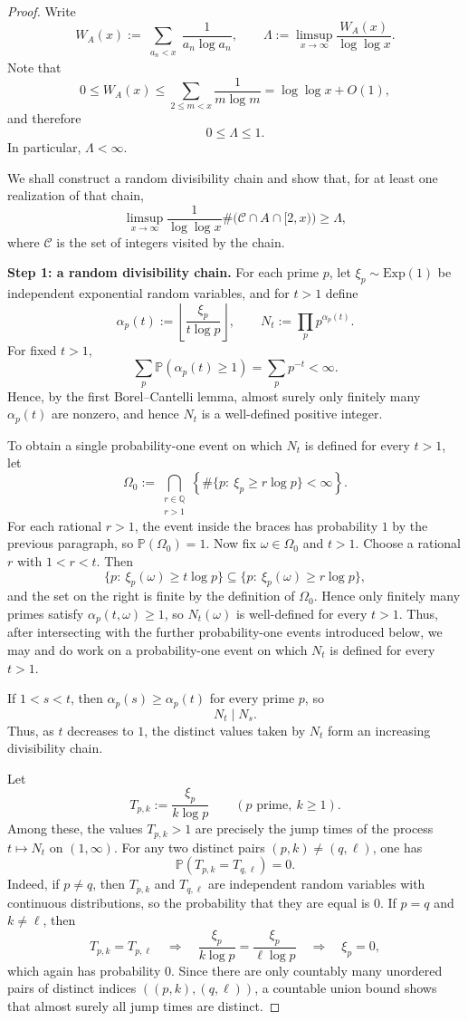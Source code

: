 \documentclass[11pt,letterpaper,reqno]{amsart}
\theoremstyle{definition}
\numberwithin{equation}{section}
\newcommand{\1}{\mathbf 1}
\begin{document}
\begin{proof}
Write
\[
W_A(x):=\sum_{\substack{a_n<x}}\frac{1}{a_n\log a_n},
\qquad
\Lambda:=\limsup_{x\to\infty}\frac{W_A(x)}{\log\log x}.
\]
Note that
\[
0\le W_A(x)\le \sum_{2\le m<x}\frac{1}{m\log m}=\log\log x+O(1),
\]
and therefore
\[
0\le \Lambda\le 1.
\]
In particular, \(\Lambda<\infty\).

We shall construct a random divisibility chain and show that, for at least one realization of that chain,
\[
\limsup_{x\to\infty}\frac{1}{\log\log x}\#\bigl(\mathcal C\cap A\cap [2,x)\bigr)\ge \Lambda,
\]
where $\mathcal C$ is the set of integers visited by the chain.

\medskip

\noindent
{\bf Step 1: a random divisibility chain.}
For each prime $p$, let $\xi_p\sim \mathrm{Exp}(1)$ be independent exponential random variables, and for $t>1$ define
\[
\alpha_p(t):=\left\lfloor \frac{\xi_p}{t\log p}\right\rfloor,
\qquad
N_t:=\prod_p p^{\alpha_p(t)}.
\]
For fixed $t>1$,
\[
\sum_p \mathbb P(\alpha_p(t)\ge 1)=\sum_p p^{-t}<\infty.
\]
Hence, by the first Borel--Cantelli lemma, almost surely only finitely many \(\alpha_p(t)\) are nonzero, and hence \(N_t\) is a well-defined positive integer.


To obtain a single probability-one event on which $N_t$ is defined for every $t>1$, let
\[
\Omega_0:=
\bigcap_{\substack{r\in\mathbb Q\\ r>1}}
\left\{
\#\{p:\ \xi_p\ge r\log p\}<\infty
\right\}.
\]
For each rational $r>1$, the event inside the braces has probability $1$ by the previous paragraph, so $\mathbb P(\Omega_0)=1$.
Now fix $\omega\in\Omega_0$ and $t>1$. Choose a rational $r$ with $1<r<t$. Then
\[
\{p:\ \xi_p(\omega)\ge t\log p\}
\subseteq
\{p:\ \xi_p(\omega)\ge r\log p\},
\]
and the set on the right is finite by the definition of $\Omega_0$. Hence only finitely many primes satisfy $\alpha_p(t,\omega)\ge 1$, so $N_t(\omega)$ is well-defined for every $t>1$.
Thus, after intersecting with the further probability-one events introduced below, we may and do work on a probability-one event on which $N_t$ is defined for every $t>1$.


If $1<s<t$, then $\alpha_p(s)\ge \alpha_p(t)$ for every prime $p$, so
\[
N_t\mid N_s.
\]
Thus, as $t$ decreases to $1$, the distinct values taken by $N_t$ form an increasing divisibility chain.

Let
\[
T_{p,k}:=\frac{\xi_p}{k\log p}\qquad (p\text{ prime},\ k\ge 1).
\]
Among these, the values \(T_{p,k}>1\) are precisely the jump times of the process \(t\mapsto N_t\) on \((1,\infty)\). For any two distinct pairs $(p,k)\neq(q,\ell)$, one has
\[
\mathbb P(T_{p,k}=T_{q,\ell})=0.
\]
Indeed, if $p\neq q$, then $T_{p,k}$ and $T_{q,\ell}$ are independent random variables with continuous distributions, so the probability that they are equal is $0$.
If $p=q$ and $k\neq \ell$, then
\[
T_{p,k}=T_{p,\ell}
\quad\Longrightarrow\quad
\frac{\xi_p}{k\log p}=\frac{\xi_p}{\ell\log p}
\quad\Longrightarrow\quad
\xi_p=0,
\]
which again has probability $0$.
Since there are only countably many unordered pairs of distinct indices $((p,k),(q,\ell))$, a countable union bound shows that almost surely all jump times are distinct.


\end{proof}
\end{document}
